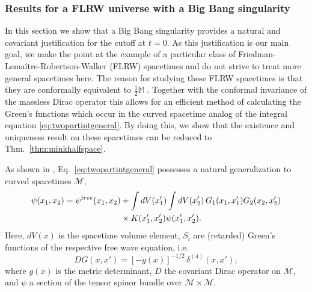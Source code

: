 \documentclass[b5paper,draft,openbib,12pt]{memoir}
\newcommand{\M}{\mathbb{M}}
\newcommand{\free}{{\textup free}}
\begin{document}
\subsubsection{Results for a FLRW universe with a Big Bang singularity} \label{sec:flrw}

In this section we show that a Big Bang singularity provides a 
natural and covariant justification for the cutoff at $t = 0$. As 
this justification is our main goal, we make the point at the 
example of a particular class of Friedman-Lema\^itre-Robertson-Walker 
(FLRW) spacetimes and do not strive to treat more general spacetimes 
here. The reason for studying these FLRW spacetimes is that they are 
conformally equivalent to $\frac{1}{2} \M$ \cite{ibison}. Together 
with the conformal invariance of the massless Dirac operator this 
allows for an efficient method of calculating the Green's functions 
which occur in the curved spacetime analog of the integral equation 
\eqref{eq:twopartintgeneral}. By doing this, we show that the existence and 
uniqueness result on these spacetimes can be reduced to Thm.\ 
\ref{thm:minkhalfspace}.

As shown in \cite{lienertcurved}, Eq.\ \eqref{eq:twopartintgeneral} possesses 
a natural generalization to curved spacetimes $\mathcal{M}$,
\begin{align}\nonumber
  \psi(x_1,x_2) = \psi^\free(x_1,x_2) &+ \int dV(x_1') \int dV(x_2') \, G_1(x_1,x_1') G_2(x_2,x_2')\\
  &\times K(x_1',x_2') \psi(x_1',x_2').
	\label{eq:inteqcurved}
\end{align}
Here, $dV(x)$ is the spacetime volume element, $S_i$ are (retarded) 
Green's functions of the respective free wave equation, i.e.\
\begin{equation}
	D G(x,x') = [-g(x)]^{-1/2} \, \delta^{(4)}(x,x'),
	\label{eq:greensfndefcurved}
\end{equation}
where $g(x)$ is the metric determinant, $D$ the covariant Dirac 
operator on $\mathcal{M}$, and $\psi$ a section of the tensor 
spinor bundle over $\mathcal{M} \times \mathcal{M}$.
\end{document}
